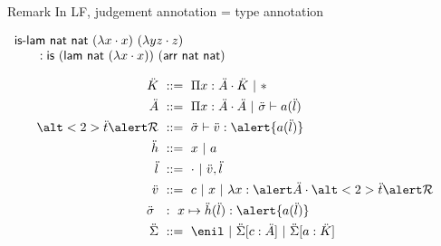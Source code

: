 \documentclass[ignorenonframetext,red]{beamer}
\begin{document}
\begin{frame}{}
  \begin{block}{Remark}
    In LF, judgement annotation = type annotation

    \begin{example}
      $
      \begin{array}{l}
        \text{\textsf{is-lam}}\ \mathsf{nat}\ \mathsf{nat}\ (\lambda{x}\cdot
        x)\ (\lambda{y z}\cdot z) \\ \qquad : \mathsf{is}\ (\mathsf{lam}\
        \mathsf{nat}\ (\lambda{x}\cdot x))\ (\mathsf{arr}\ \mathsf{nat}\
        \mathsf{nat})
      \end{array}
      $
    \end{example}
  \end{block}
  \pause
  \inXLF\inXLFa
  \begin{align*}
    \mk &\gequal \prd\mv\mf\mk \gor \type \\
    \mf &\gequal \prd\mv\mf\mf \gor \ms\vdash\lapp\mcf\ma \\
    \alt<2>\mo{\alert\mr} &\gequal \ms\vdash\typ\mval{\alert{\lapp\mcf\ma}} \\
    \mh &\gequal \mv \gor \mcf \\
    \ma &\gequal \lnil \gor \lcons\mval\ma \\
    \mval &\gequal \mco \gor \mv \gor \lam\mv{\alert\mf}{\alt<2>\mo{\alert\mr}} \\
    \ms\ &\ :\ \mv\mapsto{\laapp\mh\ma{\alert{\lapp\mcf\ma}}} \\
    \msi &\gequal { \enil \gor \ebinddecl\msi\mco\mf \gor
      \ebinddecl\msi\mcf\mk }
  \end{align*}
  \pause
\end{frame}
\end{document}

